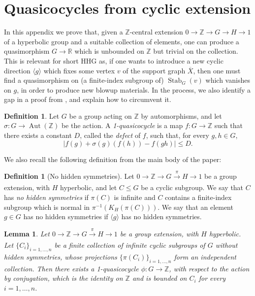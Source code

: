 \documentclass[svgnames]{amsart}
\theoremstyle{plain}
\newtheorem{lemma}[thm]{Lemma}
\theoremstyle{definition}
\newtheorem{defn}[thm]{Definition}
\newcommand{\Z}{\mathbb{Z}}
\newcommand{\R}{\mathbb{R}}
\newcommand{\ov}[1]{\overline{#1}}
\newcommand{\Stab}[2]{\operatorname{Stab}_{#1}(#2)}
\newcommand{\Aut}[1]{\operatorname{Aut}\left(#1\right)}
\begin{document}
\appendix
\section{Quasicocycles from cyclic extension}\label{sec:quasicocycles}
In this appendix we prove that, given a $\Z$-central extension $0\to \Z\to G\to H\to 1$ of a hyperbolic group and a suitable collection of elements, one can produce a quasimorphism $G\to \R$ which is unbounded on $\Z$ but trivial on the collection. This is relevant for short HHG as, if one wants to introduce a new cyclic direction $\langle g\rangle$ which fixes some vertex $v$ of the support graph $ \ov X$, then one must find a quasimorphism on (a finite-index subgroup of) $\Stab{G}{v}$ which vanishes on $g$, in order to produce new blowup materials. In the process, we also identify a gap in a proof from \cite{ELTAG_HHS}, and explain how to circumvent it.

\begin{defn}
    Let $G$ be a group acting on $\Z$ by automorphisms, and let $\sigma\colon G\to \Aut{\Z}$ be the action. A \emph{1-quasicocycle} is a map $f\colon G\to \Z$ such that there exists a constant $D$, called the \emph{defect} of $f$, such that, for every $g,h\in G$,
    $$|f(g)+\sigma(g)(f(h))-f(gh)|\le D.$$
\end{defn}

We also recall the following definition from the main body of the paper:
\begin{defn}[No hidden symmetries]
    Let $0\to \Z\to G\xrightarrow[]{\pi} H\to 1$ be a group extension, with $H$ hyperbolic, and let $C\le G$ be a cyclic subgroup. We say that $C$ has \emph{no hidden symmetries} if $\pi(C)$ is infinite and $C$ contains a finite-index subgroup which is normal in $\pi^{-1}(K_H(\pi(C)))$. We say that an element $g\in G$ has no hidden symmetries if $\langle g\rangle$ has no hidden symmetries.
\end{defn}



\begin{lemma}\label{lem:finding_quasicocycles}
    Let $0\to \Z\to G\xrightarrow[]{\pi} H\to 1$ be a group extension, with $H$ hyperbolic. Let $\{C_i\}_{i=1,\ldots,n}$ be a finite collection of infinite cyclic subgroups of $G$ without hidden symmetries, whose projections $\{\pi(C_i)\}_{i=1,\ldots,n}$ form an independent collection. Then there exists a 1-quasicocycle $\phi\colon G\to \Z$, with respect to the action by conjugation, which is the identity on $\Z$ and is bounded on $C_i $ for every $i=1,\ldots,n$.
\end{lemma}
\end{document}
